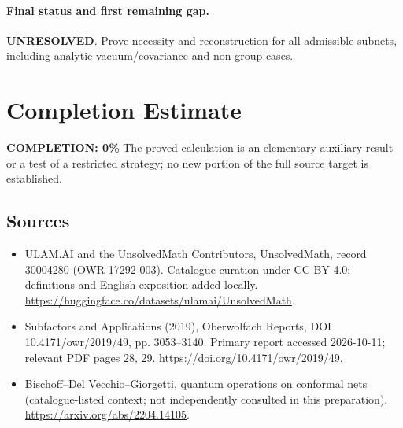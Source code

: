 \documentclass[11pt]{article}
\begin{document}
\paragraph{Final status and first remaining gap.}
\textbf{UNRESOLVED}. Prove necessity and reconstruction for all admissible subnets, including analytic vacuum/covariance and non-group cases.

\section{Completion Estimate}
\noindent\textbf{COMPLETION: 0\%}
The proved calculation is an elementary auxiliary result or a test of a restricted strategy; no new portion of the full source target is established.

\subsection{Sources}
\begin{itemize}
\item[\hypertarget{source:30004280:1}{S1}] ULAM.AI and the UnsolvedMath Contributors, UnsolvedMath, record 30004280 (OWR-17292-003). Catalogue curation under CC BY 4.0; definitions and English exposition added locally.
\url{https://huggingface.co/datasets/ulamai/UnsolvedMath}.
\item[\hypertarget{source:30004280:2}{S2}] Subfactors and Applications (2019), Oberwolfach Reports, DOI 10.4171/owr/2019/49, pp. 3053--3140. Primary report accessed 2026-10-11; relevant PDF pages 28, 29.
\url{https://doi.org/10.4171/owr/2019/49}.
\item[\hypertarget{source:30004280:3}{S3}] Bischoff--Del Vecchio--Giorgetti, quantum operations on conformal nets (catalogue-listed context; not independently consulted in this preparation).
\url{https://arxiv.org/abs/2204.14105}.
\end{itemize}
\label{end:30004280}
\end{document}
